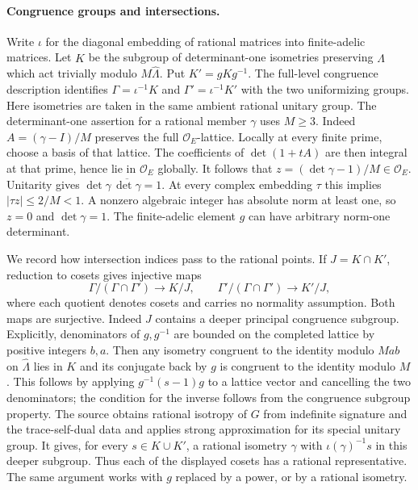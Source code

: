 \paragraph{Congruence groups and intersections.}
Write \(\iota\) for the diagonal embedding of rational matrices into
finite-adelic matrices. Let \(K\) be the subgroup of determinant-one
isometries preserving \(\widehat\Lambda\) which act trivially modulo
\(M\widehat\Lambda\). Put \(K'=gKg^{-1}\). The full-level congruence
description identifies \(\Gamma=\iota^{-1}K\) and
\(\Gamma'=\iota^{-1}K'\) with the two uniformizing groups. Here
isometries are taken in the same ambient rational unitary group.
The determinant-one assertion for a rational member \(\gamma\)
uses \(M\ge3\). Indeed \(A=(\gamma-I)/M\) preserves the full
\(\mathcal O_E\)-lattice. Locally at every finite prime, choose a
basis of that lattice. The coefficients of \(\det(1+tA)\) are then
integral at that prime, hence lie in \(\mathcal O_E\) globally.
It follows that \(z=(\det\gamma-1)/M\in\mathcal O_E\).
Unitarity gives \(\det\gamma\,\overline{\det\gamma}=1\). At every
complex embedding \(\tau\) this implies
\(|\tau z|\le2/M<1\). A nonzero algebraic integer has absolute norm
at least one, so \(z=0\) and \(\det\gamma=1\). The finite-adelic
element \(g\) can have arbitrary norm-one determinant.

We record how intersection indices pass to the rational points.
If \(J=K\cap K'\), reduction to cosets gives injective maps
\[
 \Gamma/(\Gamma\cap\Gamma')\longrightarrow K/J,\qquad
 \Gamma'/(\Gamma\cap\Gamma')\longrightarrow K'/J ,
\]
where each quotient denotes cosets and carries no normality assumption.
Both maps are surjective. Indeed \(J\) contains a deeper principal
congruence subgroup. Explicitly, denominators of \(g,g^{-1}\)
are bounded on the completed lattice by positive integers \(b,a\).
Then any isometry congruent to the identity modulo \(Mab\) on
\(\widehat\Lambda\) lies in \(K\) and its conjugate back by \(g\)
is congruent to the identity modulo \(M\). This follows by applying
\(g^{-1}(s-1)g\) to a lattice vector and cancelling the two denominators;
the condition for the inverse follows from the congruence subgroup
property. The source obtains rational isotropy of \(G\) from indefinite
signature and the trace-self-dual data and applies strong approximation
for its special unitary group. It gives, for every \(s\in K\cup K'\),
a rational isometry \(\gamma\) with
\(\iota(\gamma)^{-1}s\) in this deeper subgroup. Thus each of the
displayed cosets has a rational representative. The same argument works
with \(g\) replaced by a power, or by a rational isometry.

